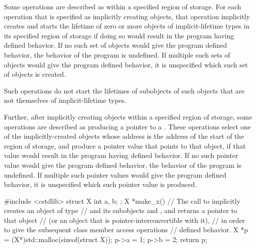 \pnum
Some operations are described as
within a specified region of storage.
For each operation that is specified as implicitly creating objects,
that operation implicitly creates and starts the lifetime of
zero or more objects of implicit-lifetime types
in its specified region of storage
if doing so would result in the program having defined behavior.
If no such set of objects would give the program defined behavior,
the behavior of the program is undefined.
If multiple such sets of objects would give the program defined behavior,
it is unspecified which such set of objects is created.
\begin{note}
Such operations do not start the lifetimes of subobjects of such objects
that are not themselves of implicit-lifetime types.
\end{note}

\pnum
Further, after implicitly creating objects within a specified region of storage,
some operations are described as producing a pointer to a
.
These operations select one of the implicitly-created objects
whose address is the address of the start of the region of storage,
and produce a pointer value that points to that object,
if that value would result in the program having defined behavior.
If no such pointer value would give the program defined behavior,
the behavior of the program is undefined.
If multiple such pointer values would give the program defined behavior,
it is unspecified which such pointer value is produced.

\pnum
\begin{example}
\begin{codeblock}
#include <cstdlib>
struct X { int a, b; };
X *make_x() {
  // The call to  implicitly creates an object of type 
  // and its subobjects  and , and returns a pointer to that  object
  // (or an object that is pointer-interconvertible with it),
  // in order to give the subsequent class member access operations
  // defined behavior.
  X *p = (X*)std::malloc(sizeof(struct X));
  p->a = 1;
  p->b = 2;
  return p;
}
\end{codeblock}
\end{example}

